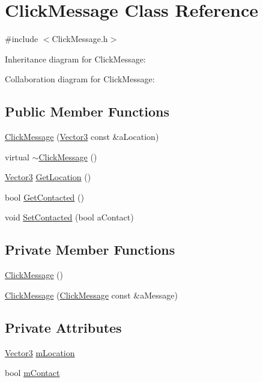 \hypertarget{classClickMessage}{}\section{Click\+Message Class Reference}
\label{classClickMessage}


{\ttfamily \#include $<$Click\+Message.\+h$>$}



Inheritance diagram for Click\+Message\+:


Collaboration diagram for Click\+Message\+:
\subsection*{Public Member Functions}
\begin{DoxyCompactItemize}
\item 
\hyperlink{classClickMessage_aa5c29d234bfc155ada4dbd35331b19fe}{Click\+Message} (\hyperlink{structVector3}{Vector3} const \&a\+Location)
\item 
virtual \hyperlink{classClickMessage_a7092834fea4471eb3ac0e4bf175b70a4}{$\sim$\+Click\+Message} ()
\item 
\hyperlink{structVector3}{Vector3} \hyperlink{classClickMessage_a72bfd2ac8e4991f03ebedd0ec4390b92}{Get\+Location} ()
\item 
bool \hyperlink{classClickMessage_a469a10171591586fc98a39bcef128543}{Get\+Contacted} ()
\item 
void \hyperlink{classClickMessage_a1da7b531352048666d4a89c4bc0788c8}{Set\+Contacted} (bool a\+Contact)
\end{DoxyCompactItemize}
\subsection*{Private Member Functions}
\begin{DoxyCompactItemize}
\item 
\hyperlink{classClickMessage_a9706f1044fc6d66e1d7b6423ee0b8872}{Click\+Message} ()
\item 
\hyperlink{classClickMessage_a6323a92ab067dc78026dfe75b26898fa}{Click\+Message} (\hyperlink{classClickMessage}{Click\+Message} const \&a\+Message)
\end{DoxyCompactItemize}
\subsection*{Private Attributes}
\begin{DoxyCompactItemize}
\item 
\hyperlink{structVector3}{Vector3} \hyperlink{classClickMessage_a2ae8a8d133bcc1ae29cf7f79f55708d4}{m\+Location}
\item 
bool \hyperlink{classClickMessage_aa7ddf25c1da734c36853d8576298d8a1}{m\+Contact}
\end{DoxyCompactItemize}
